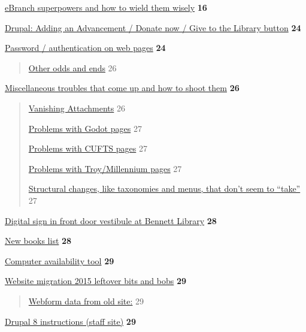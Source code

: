 \documentclass[
  openany]{book}
\begin{document}
\protect\hyperlink{ebranch-superpowers-and-how-to-wield-them-wisely}{eBranch superpowers and how to wield them
wisely} \textbf{16}

\protect\hyperlink{drupal-adding-an-advancement-donate-now-give-to-the-library-button}{Drupal: Adding an Advancement / Donate now / Give to the Library
button}
\textbf{24}

\protect\hyperlink{password-authentication-on-web-pages}{Password / authentication on web
pages} \textbf{24}

\begin{quote}
\protect\hyperlink{other-odds-and-ends}{Other odds and ends} 26
\end{quote}

\protect\hyperlink{miscellaneous-troubles-that-come-up-and-how-to-shoot-them}{Miscellaneous troubles that come up and how to shoot
them} \textbf{26}

\begin{quote}
\protect\hyperlink{vanishing-attachments}{Vanishing Attachments} 26

\protect\hyperlink{problems-with-godot-pages}{Problems with Godot pages} 27

\protect\hyperlink{problems-with-cufts-pages}{Problems with CUFTS pages} 27

\protect\hyperlink{problems-with-troymillennium-pages}{Problems with Troy/Millennium
pages} 27

\protect\hyperlink{structural-changes-like-taxonomies-and-menus-that-dont-seem-to-take}{Structural changes, like taxonomies and menus, that don't seem to
``take''}
27
\end{quote}

\protect\hyperlink{digital-sign-in-front-door-vestibule-at-bennett-library}{Digital sign in front door vestibule at Bennett
Library}
\textbf{28}

\protect\hyperlink{new-books-list}{New books list} \textbf{28}

\protect\hyperlink{computer-availability-tool}{Computer availability tool} \textbf{29}

\protect\hyperlink{website-migration-2015-leftover-bits-and-bobs}{Website migration 2015 leftover bits and
bobs} \textbf{29}

\begin{quote}
\protect\hyperlink{webform-data-from-old-site}{Webform data from old site:} 29
\end{quote}

\protect\hyperlink{drupal-8-instructions-staff-site}{Drupal 8 instructions (staff site)}
\textbf{29}
\end{document}
